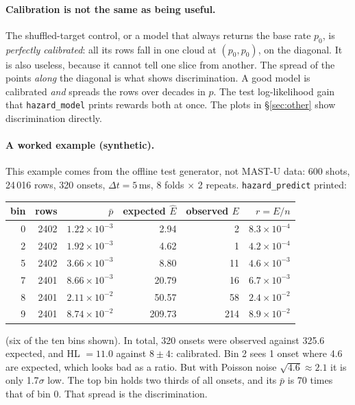 \documentclass[11pt]{article}
\begin{document}
\paragraph{Calibration is not the same as being useful.}
The shuffled-target control, or a model that always returns the base rate $p_0$,
is \emph{perfectly calibrated}: all its rows fall in one cloud at $(p_0,p_0)$,
on the diagonal. It is also useless, because it cannot tell one slice from
another. The spread of the points \emph{along} the diagonal is what shows
discrimination. A good model is calibrated \emph{and} spreads the rows over
decades in $p$. The test log-likelihood gain that \texttt{hazard\_model} prints
rewards both at once. The plots in \S\ref{sec:other} show discrimination
directly.

\paragraph{A worked example (synthetic).}
This example comes from the offline test generator, not MAST-U data:
$600$ shots, 24\,016 rows, 320 onsets, $\Delta t=5$\,ms, 8 folds $\times$ 2
repeats. \texttt{hazard\_predict} printed:
\begin{center}\footnotesize
\begin{tabular}{rrrrrr}
\toprule
bin & rows & $\bar p$ & expected $\hat E$ & observed $E$ & $r=E/n$ \\
\midrule
0 & 2402 & $1.22\times10^{-3}$ & 2.94 & 2 & $8.3\times10^{-4}$\\
2 & 2402 & $1.92\times10^{-3}$ & 4.62 & 1 & $4.2\times10^{-4}$\\
5 & 2402 & $3.66\times10^{-3}$ & 8.80 & 11 & $4.6\times10^{-3}$\\
7 & 2401 & $8.66\times10^{-3}$ & 20.79 & 16 & $6.7\times10^{-3}$\\
8 & 2401 & $2.11\times10^{-2}$ & 50.57 & 58 & $2.4\times10^{-2}$\\
9 & 2401 & $8.74\times10^{-2}$ & 209.73 & 214 & $8.9\times10^{-2}$\\
\bottomrule
\end{tabular}
\end{center}
(six of the ten bins shown). In total, 320 onsets were observed against 325.6
expected, and HL $=11.0$ against $8\pm4$: calibrated. Bin 2 sees 1 onset where
4.6 are expected, which looks bad as a ratio. But with Poisson noise
$\sqrt{4.6}\approx2.1$ it is only 1.7$\sigma$ low. The top bin holds two
thirds of all onsets, and its $\bar p$ is 70 times that of bin 0. That spread is
the discrimination.
\end{document}

